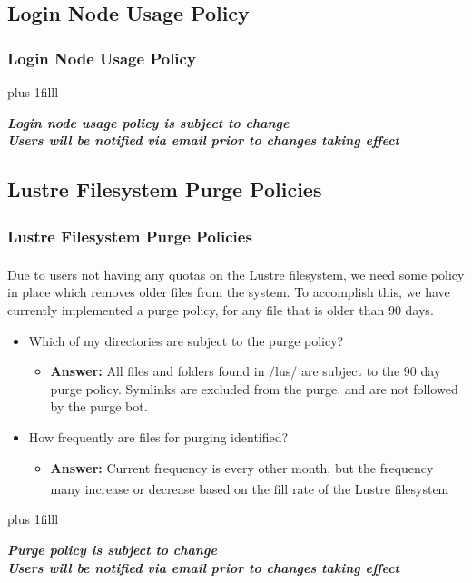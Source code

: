 \documentclass[t,hyperref={pdfpagelabels=false}]{beamer}
\newcommand{\ctilde}{{\fontfamily{ptm}\selectfont\texttildelow}}
\newcommand{\regtrademark}{\fontsize{5}{6}\selectfont \textsuperscript{\textregistered}}
\newcommand{\btVFill}{\vskip0pt plus 1filll}
\newcommand{\lustre}{Lustre{\regtrademark}}
\begin{document}
\subsection{Login Node Usage Policy}
\begin{frame}
\frametitle{Login Node Usage Policy}
\btVFill
\begin{center}
\footnotesize \textbf{\emph{Login node usage policy is subject to change~\\Users will be notified via email prior to changes taking effect}}
\end{center}
\end{frame}


\subsection{Lustre Filesystem Purge Policies}
\begin{frame}
\frametitle{{\lustre} Filesystem Purge Policies}
Due to users not having any quotas on the {\lustre} filesystem, we need some policy in place which removes older files from the system.  To accomplish this, we have currently implemented a purge policy, for any file that is older than 90 days.
\begin{itemize}
 \item Which of my directories are subject to the purge policy?
   \begin{itemize}
   \item \textbf{Answer:} All files and folders found in \ctilde/lus/ are subject to the 90 day purge policy.  Symlinks are excluded from the purge, and are not followed by the purge bot.  
   \end{itemize}
\item How frequently are files for purging identified?
   \begin{itemize}
   \item \textbf{Answer:} Current frequency is every other month, but the frequency many increase or decrease based on the fill rate of the {\lustre} filesystem 
	\end{itemize}
\end{itemize}
\btVFill
\begin{center}
\footnotesize \textbf{\emph{Purge policy is subject to change~\\Users will be notified via email prior to changes taking effect}}
\end{center}

\end{frame}
\end{document}
